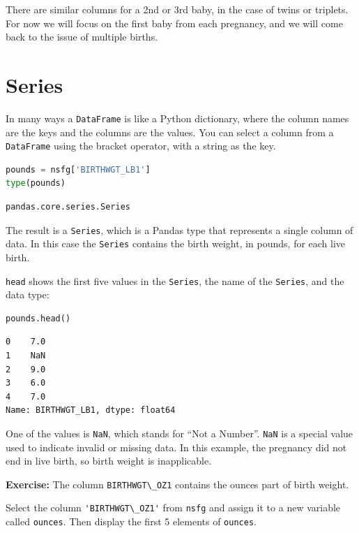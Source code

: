 \documentclass[
]{book}
\newcommand{\passthrough}[1]{#1}
\begin{document}
There are similar columns for a 2nd or 3rd baby, in the case of twins or
triplets. For now we will focus on the first baby from each pregnancy,
and we will come back to the issue of multiple births.

\section{Series}\label{series}

In many ways a \passthrough{\lstinline!DataFrame!} is like a Python
dictionary, where the column names are the keys and the columns are the
values. You can select a column from a
\passthrough{\lstinline!DataFrame!} using the bracket operator, with a
string as the key.

\begin{lstlisting}[language=Python]
pounds = nsfg['BIRTHWGT_LB1']
type(pounds)
\end{lstlisting}

\begin{lstlisting}
pandas.core.series.Series
\end{lstlisting}

The result is a \passthrough{\lstinline!Series!}, which is a Pandas type
that represents a single column of data. In this case the
\passthrough{\lstinline!Series!} contains the birth weight, in pounds,
for each live birth.

\passthrough{\lstinline!head!} shows the first five values in the
\passthrough{\lstinline!Series!}, the name of the
\passthrough{\lstinline!Series!}, and the data type:

\begin{lstlisting}[language=Python]
pounds.head()
\end{lstlisting}

\begin{lstlisting}
0    7.0
1    NaN
2    9.0
3    6.0
4    7.0
Name: BIRTHWGT_LB1, dtype: float64
\end{lstlisting}

One of the values is \passthrough{\lstinline!NaN!}, which stands for
``Not a Number''. \passthrough{\lstinline!NaN!} is a special value used
to indicate invalid or missing data. In this example, the pregnancy did
not end in live birth, so birth weight is inapplicable.

\textbf{Exercise:} The column \passthrough{\lstinline!BIRTHWGT\_OZ1!}
contains the ounces part of birth weight.

Select the column \passthrough{\lstinline!'BIRTHWGT\_OZ1'!} from
\passthrough{\lstinline!nsfg!} and assign it to a new variable called
\passthrough{\lstinline!ounces!}. Then display the first 5 elements of
\passthrough{\lstinline!ounces!}.
\end{document}
